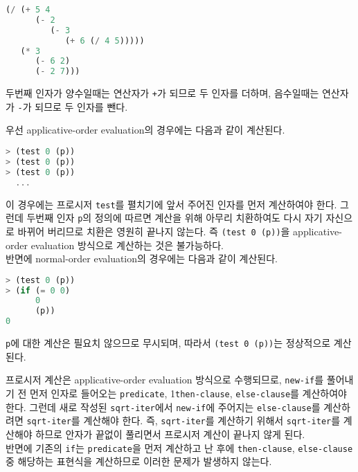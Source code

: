 \begin{lstlisting}[language=Scheme]
(/ (+ 5 4
      (- 2
         (- 3
            (+ 6 (/ 4 5)))))
   (* 3
      (- 6 2)
      (- 2 7)))
\end{lstlisting}


두번째 인자가 양수일때는 연산자가 \texttt{+}가 되므로 두 인자를 더하며,
음수일때는 연산자가 \texttt{-}가 되므로 두 인자를 뺀다.

우선 applicative-order evaluation의 경우에는 다음과 같이 계산된다.
\begin{lstlisting}[language=Scheme]
> (test 0 (p))
> (test 0 (p))
> (test 0 (p))
  ...
\end{lstlisting}
이 경우에는 프로시저 \texttt{test}를 펼치기에 앞서 주어진 인자를 먼저 계산하여야
한다. 그런데 두번째 인자 \texttt{p}의 정의에 따르면 계산을 위해 아무리
치환하여도 다시 자기 자신으로 바뀌어 버리므로 치환은 영원히 끝나지 않는다. 즉
\texttt{(test 0 (p))}을 applicative-order evaluation 방식으로 계산하는 것은
불가능하다.\\

반면에 normal-order evaluation의 경우에는 다음과 같이 계산된다.
\begin{lstlisting}[language=Scheme]
> (test 0 (p))
> (if (= 0 0)
      0
      (p))
0
\end{lstlisting}
\texttt{p}에 대한 계산은 필요치 않으므로 무시되며, 따라서 \texttt{(test 0
  (p))}는 정상적으로 계산된다.


 프로시저 계산은 applicative-order evaluation 방식으로 수행되므로,
\texttt{new-if}를 풀어내기 전 먼저 인자로 들어오는 \texttt{predicate},
1\texttt{then-clause}, \texttt{else-clause}를 계산하여야 한다. 그런데 새로
작성된 \texttt{sqrt-iter}에서 \texttt{new-if}에 주어지는
\texttt{else-clause}를 계산하려면 \texttt{sqrt-iter}를 계산해야 한다. 즉,
\texttt{sqrt-iter}를 계산하기 위해서 \texttt{sqrt-iter}를 계산해야 하므로
안자가 끝없이 풀리면서 프로시저 계산이 끝나지 않게 된다.\\

반면에 기존의 \texttt{if}는 \texttt{predicate}을 먼저 계산하고 난 후에
\texttt{then-clause}, \texttt{else-clause} 중 해당하는 표현식을 계산하므로
이러한 문제가 발생하지 않는다.

